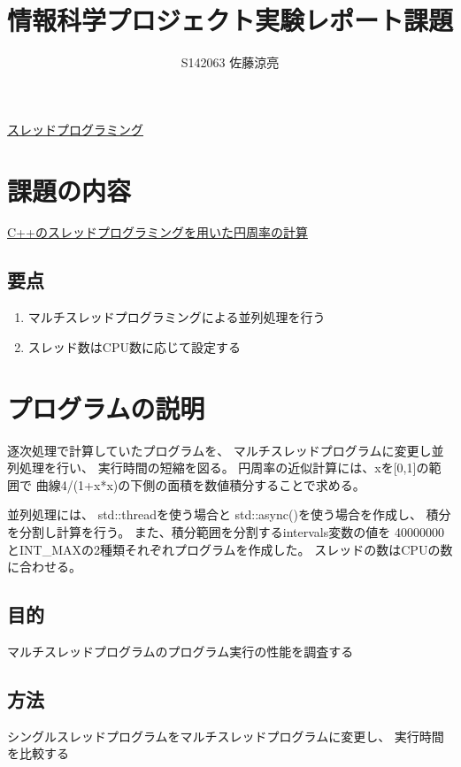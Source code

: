 \documentclass[a4j]{jarticle}
\title{情報科学プロジェクト実験レポート課題}
\author{S142063 佐藤涼亮}
\begin{document}
\maketitle
\centerline{\LARGE \underline{スレッドプログラミング}}
\section{課題の内容}
{\large \underline{C++のスレッドプログラミングを用いた円周率の計算}}
\subsection{要点}
\begin{enumerate}
\item マルチスレッドプログラミングによる並列処理を行う
\item スレッド数はCPU数に応じて設定する
\end{enumerate}
\section{プログラムの説明}
逐次処理で計算していたプログラムを、
マルチスレッドプログラムに変更し並列処理を行い、
実行時間の短縮を図る。
円周率の近似計算には、xを[0,1]の範囲で
曲線4/(1+x*x)の下側の面積を数値積分することで求める。

並列処理には、
std::threadを使う場合と
std::async()を使う場合を作成し、
積分を分割し計算を行う。
また、積分範囲を分割するintervals変数の値を
40000000とINT\_MAXの2種類それぞれプログラムを作成した。
スレッドの数はCPUの数に合わせる。

\subsection{目的}
マルチスレッドプログラムのプログラム実行の性能を調査する

\subsection{方法}
シングルスレッドプログラムをマルチスレッドプログラムに変更し、
実行時間を比較する
\end{document}
